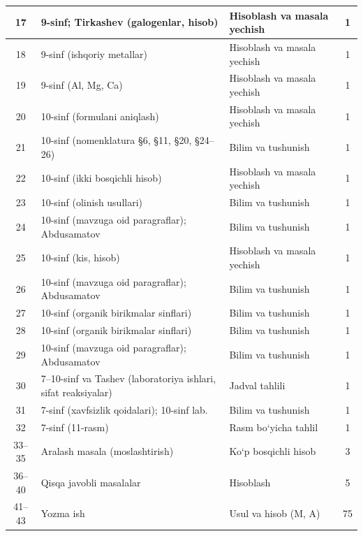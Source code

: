 \documentclass[11pt,a4paper]{article}
\begin{document}
{\begin{longtable}{|c|p{7.2cm}|p{5.4cm}|c|}
17 & 9-sinf; Tirkashev (galogenlar, hisob) & Hisoblash va masala yechish & 1\\\hline
18 & 9-sinf (ishqoriy metallar) & Hisoblash va masala yechish & 1\\\hline
19 & 9-sinf (Al, Mg, Ca) & Hisoblash va masala yechish & 1\\\hline
20 & 10-sinf (formulani aniqlash) & Hisoblash va masala yechish & 1\\\hline
21 & 10-sinf (nomenklatura \S{}6, \S{}11, \S{}20, \S{}24--26) & Bilim va tushunish & 1\\\hline
22 & 10-sinf (ikki bosqichli hisob) & Hisoblash va masala yechish & 1\\\hline
23 & 10-sinf (olinish usullari) & Bilim va tushunish & 1\\\hline
24 & 10-sinf (mavzuga oid paragraflar); Abdusamatov & Bilim va tushunish & 1\\\hline
25 & 10-sinf (kis, hisob) & Hisoblash va masala yechish & 1\\\hline
26 & 10-sinf (mavzuga oid paragraflar); Abdusamatov & Bilim va tushunish & 1\\\hline
27 & 10-sinf (organik birikmalar sinflari) & Bilim va tushunish & 1\\\hline
28 & 10-sinf (organik birikmalar sinflari) & Bilim va tushunish & 1\\\hline
29 & 10-sinf (mavzuga oid paragraflar); Abdusamatov & Bilim va tushunish & 1\\\hline
30 & 7--10-sinf va Tashev (laboratoriya ishlari, sifat reaksiyalar) & Jadval tahlili & 1\\\hline
31 & 7-sinf (xavfsizlik qoidalari); 10-sinf lab. & Bilim va tushunish & 1\\\hline
32 & 7-sinf (11-rasm) & Rasm bo`yicha tahlil & 1\\\hline
33--35 & Aralash masala (moslashtirish) & Ko`p bosqichli hisob & 3\\\hline
36--40 & Qisqa javobli masalalar & Hisoblash & 5\\\hline
41--43 & Yozma ish & Usul va hisob (M, A) & 75\\\hline
\end{longtable}}
\end{document}
